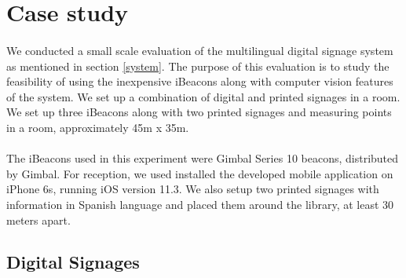 \documentclass[12pt]{article}
\begin{document}
\section{Case study}
\label{evaluation}

%


\paragraph{}We conducted a small scale evaluation of the multilingual digital signage system as mentioned in section \ref{system}. The purpose of this evaluation is to study the feasibility of using the inexpensive iBeacons along with computer vision features of the system. We set up a combination of digital and printed signages in a room. We set up three iBeacons along with two printed signages and measuring points in a room, approximately 45m x 35m.

\paragraph{}The iBeacons used in this experiment were Gimbal Series 10 beacons, distributed by Gimbal. For reception, we used installed the developed mobile application on iPhone 6s, running iOS version 11.3. We also setup two printed signages with information in Spanish language and placed them around the library, at least 30 meters apart.

\subsection{Digital Signages }
\end{document}
